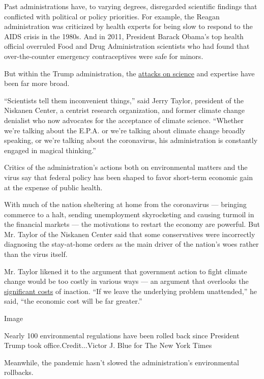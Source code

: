 Past administrations have, to varying degrees, disregarded scientific
findings that conflicted with political or policy priorities. For
example, the Reagan administration was criticized by health experts for
being slow to respond to the AIDS crisis in the 1980s. And in 2011,
President Barack Obama's top health official overruled Food and Drug
Administration scientists who had found that over-the-counter emergency
contraceptives were safe for minors.

But within the Trump administration, the
\href{https://www.nytimes3xbfgragh.onion/2019/12/28/climate/trump-administration-war-on-science.html}{attacks
on science} and expertise have been far more broad.

``Scientists tell them inconvenient things,'' said Jerry Taylor,
president of the Niskanen Center, a centrist research organization, and
former climate change denialist who now advocates for the acceptance of
climate science. ``Whether we're talking about the E.P.A. or we're
talking about climate change broadly speaking, or we're talking about
the coronavirus, his administration is constantly engaged in magical
thinking.''

Critics of the administration's actions both on environmental matters
and the virus say that federal policy has been shaped to favor
short-term economic gain at the expense of public health.

With much of the nation sheltering at home from the coronavirus ---
bringing commerce to a halt, sending unemployment skyrocketing and
causing turmoil in the financial markets --- the motivations to restart
the economy are powerful. But Mr. Taylor of the Niskanen Center said
that some conservatives were incorrectly diagnosing the stay-at-home
orders as the main driver of the nation's woes rather than the virus
itself.

Mr. Taylor likened it to the argument that government action to fight
climate change would be too costly in various ways --- an argument that
overlooks the
\href{https://www.nytimes3xbfgragh.onion/2018/11/19/climate/climate-disasters.html}{significant
costs} of inaction. ``If we leave the underlying problem unattended,''
he said, ``the economic cost will be far greater.''

Image

Nearly 100 environmental regulations have been rolled back since
President Trump took office.Credit...Victor J. Blue for The New York
Times

Meanwhile, the pandemic hasn't slowed the administration's environmental
rollbacks.

